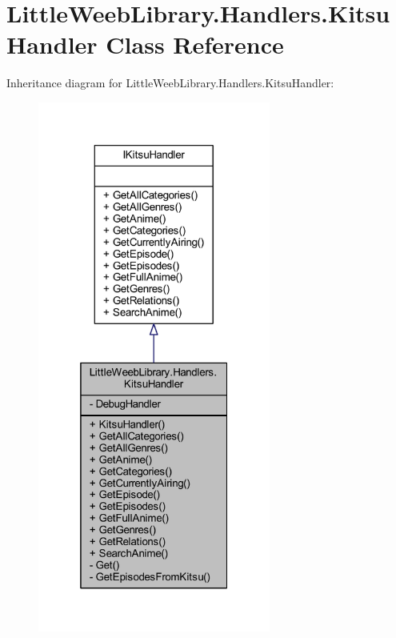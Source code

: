 \hypertarget{class_little_weeb_library_1_1_handlers_1_1_kitsu_handler}{}\section{Little\+Weeb\+Library.\+Handlers.\+Kitsu\+Handler Class Reference}
\label{class_little_weeb_library_1_1_handlers_1_1_kitsu_handler}


Inheritance diagram for Little\+Weeb\+Library.\+Handlers.\+Kitsu\+Handler\+:\nopagebreak
\begin{figure}[H]
\begin{center}
\leavevmode
\includegraphics[width=217pt]{class_little_weeb_library_1_1_handlers_1_1_kitsu_handler__inherit__graph}
\end{center}
\end{figure}


